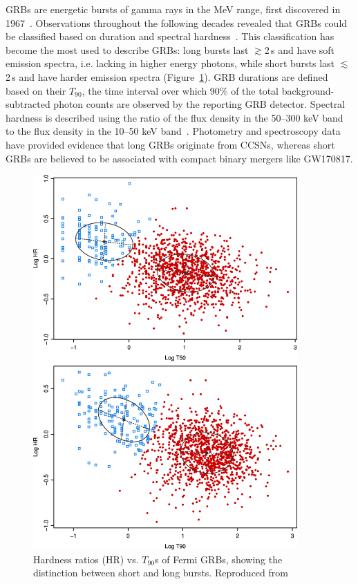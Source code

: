 \Acp{GRB} are energetic bursts of gamma rays in the MeV range, first discovered in 1967~\citep{Klebesadel_1973}.
Observations throughout the following decades revealed that \acp{GRB} could be classified based on duration and spectral hardness~\citep{Kouveliotou_1993}.
This classification has become the most used to describe \acp{GRB}: long bursts last $\gtrsim$2\,s and have soft emission spectra, i.e. lacking in higher energy photons, while short bursts last $\lesssim$2\,s and have harder emission spectra (Figure~\ref{fig:grb-classification}).
GRB durations are defined based on their $T_{90}$, the time interval over which 90\% of the total background-subtracted photon counts are observed by the reporting GRB detector.
Spectral hardness is described using the ratio of the flux density in the 50–300 keV band to the flux density in the 10–50 keV band~\citep{fermi_2020}.
Photometry and spectroscopy data have provided evidence that long \acp{GRB} originate from \acp{CCSN}, whereas short \acp{GRB} are believed to be associated with compact binary mergers like GW170817.

\begin{figure}[htb]
	\includegraphics[trim={0 0 0 6cm}, clip, width=0.9\textwidth]{figures/gw/grb-classification.jpg}
	\caption{Hardness ratios (HR) vs. $T_{90}$s of Fermi GRBs, showing the distinction between short and long bursts. Reproduced from~\protect\citet{fermi_2016}}
	\label{fig:grb-classification}
\end{figure}

